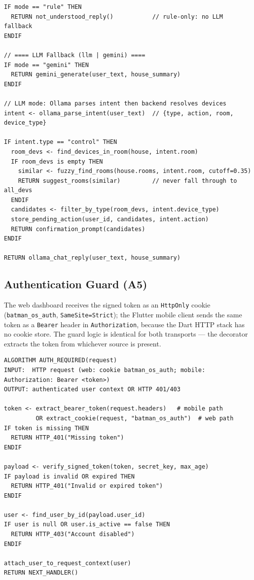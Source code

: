 \begin{lstlisting}[numbers=none,caption={A4: Alfred AI three-layer inference pipeline},label={lst:pseudo_alfred_flow}]
IF mode == "rule" THEN
  RETURN not_understood_reply()           // rule-only: no LLM fallback
ENDIF

// ==== LLM Fallback (llm | gemini) ====
IF mode == "gemini" THEN
  RETURN gemini_generate(user_text, house_summary)
ENDIF

// LLM mode: Ollama parses intent then backend resolves devices
intent <- ollama_parse_intent(user_text)  // {type, action, room, device_type}

IF intent.type == "control" THEN
  room_devs <- find_devices_in_room(house, intent.room)
  IF room_devs is empty THEN
    similar <- fuzzy_find_rooms(house.rooms, intent.room, cutoff=0.35)
    RETURN suggest_rooms(similar)         // never fall through to all_devs
  ENDIF
  candidates <- filter_by_type(room_devs, intent.device_type)
  store_pending_action(user_id, candidates, intent.action)
  RETURN confirmation_prompt(candidates)
ENDIF

RETURN ollama_chat_reply(user_text, house_summary)
\end{lstlisting}

\subsection{Authentication Guard (A5)}

The web dashboard receives the signed token as an \texttt{HttpOnly} cookie (\texttt{batman\_os\_auth}, \texttt{SameSite=Strict}); the Flutter mobile client sends the same token as a \texttt{Bearer} header in \texttt{Authorization}, because the Dart HTTP stack has no cookie store.
The guard logic is identical for both transports --- the decorator extracts the token from whichever source is present.

\begin{lstlisting}[numbers=none,caption={A5: Authentication guard (web: HttpOnly cookie; mobile: Bearer header)},label={lst:pseudo_auth_guard}]
ALGORITHM AUTH_REQUIRED(request)
INPUT:  HTTP request (web: cookie batman_os_auth; mobile: Authorization: Bearer <token>)
OUTPUT: authenticated user context OR HTTP 401/403

token <- extract_bearer_token(request.headers)   # mobile path
         OR extract_cookie(request, "batman_os_auth")  # web path
IF token is missing THEN
  RETURN HTTP_401("Missing token")
ENDIF

payload <- verify_signed_token(token, secret_key, max_age)
IF payload is invalid OR expired THEN
  RETURN HTTP_401("Invalid or expired token")
ENDIF

user <- find_user_by_id(payload.user_id)
IF user is null OR user.is_active == false THEN
  RETURN HTTP_403("Account disabled")
ENDIF

attach_user_to_request_context(user)
RETURN NEXT_HANDLER()
\end{lstlisting}

